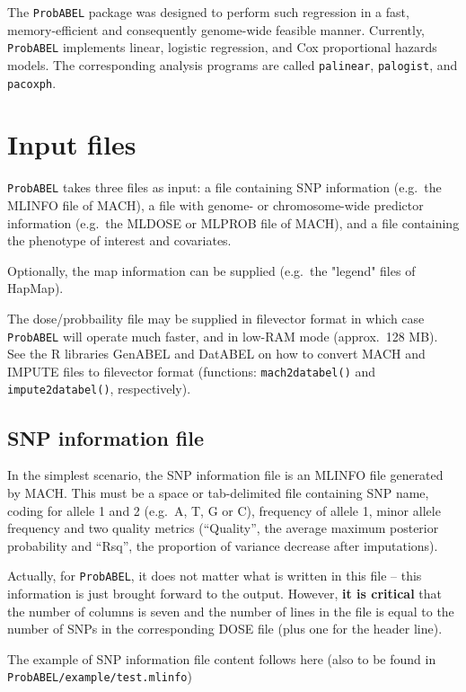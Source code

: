 \documentclass[12pt,a4paper]{article}
\begin{document}
The \texttt{ProbABEL} package was designed to perform such regression
in a fast, memory-efficient and consequently genome-wide feasible manner. 
Currently, \texttt{ProbABEL} implements linear, logistic regression, 
and Cox proportional hazards models. The corresponding analysis 
programs are called \texttt{palinear},  \texttt{palogist},  
and \texttt{pacoxph}.


\section{Input files}
\texttt{ProbABEL} takes three files as input: a file containing SNP 
information (e.g.~the MLINFO file of MACH), a file with genome- or 
chromosome-wide predictor information (e.g.~the MLDOSE or MLPROB file of MACH), 
and a file containing the phenotype of interest and covariates. 

Optionally, the map information can be supplied (e.g.~the "legend" 
files of HapMap). 

The dose/probbaility file may be supplied in filevector format 
in which case \texttt{ProbABEL} will operate much faster, and 
in low-RAM mode (approx.~128 MB). See the R libraries GenABEL and 
DatABEL on how to convert MACH and IMPUTE files to 
filevector format (functions: \texttt{mach2databel()} and
\texttt{impute2databel()}, respectively).

\subsection{SNP information file}
\label{ssec:infoin}
In the simplest scenario, the SNP information file is an MLINFO 
file generated by MACH. This must be a space or tab-delimited file 
containing SNP name, coding for allele 1 and 2 (e.g.~A, T, G or C), 
frequency of allele 1, minor allele frequency and two quality 
metrics (``Quality'', the average maximum posterior probability and 
``Rsq'', the proportion of variance decrease after imputations). 

Actually, 
for \texttt{ProbABEL}, it does not matter what is written in this file -- 
this information is just brought forward to the output. However, 
\textbf{it is critical} that the number of columns is seven and the number 
of lines in the file is equal to the number of SNPs in the 
corresponding DOSE file (plus one for the header line). 

The example of SNP information file content follows here (also 
to be found in \texttt{ProbABEL/example/test.mlinfo})
\end{document}
